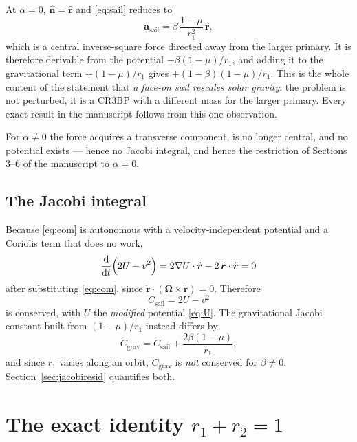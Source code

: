\documentclass[11pt,a4paper]{article}
\newcommand{\rhat}{\hat{\bm{r}}}
\newcommand{\nhat}{\hat{\bm{n}}}
\begin{document}
At $\alpha=0$, $\nhat=\rhat$ and \eqref{eq:sail} reduces to
\begin{equation}
  \bm{a}_{\mathrm{sail}} = \beta\,\frac{1-\mu}{r_1^2}\,\rhat ,
\end{equation}
which is a central inverse-square force directed away from the larger primary.
It is therefore derivable from the potential $-\beta(1-\mu)/r_1$, and adding it
to the gravitational term $+(1-\mu)/r_1$ gives $+(1-\beta)(1-\mu)/r_1$. This is
the whole content of the statement that \emph{a face-on sail rescales solar
gravity}: the problem is not perturbed, it is a CR3BP with a different mass for
the larger primary. Every exact result in the manuscript follows from this one
observation.

For $\alpha\neq0$ the force acquires a transverse component, is no longer
central, and no potential exists --- hence no Jacobi integral, and hence the
restriction of Sections 3--6 of the manuscript to $\alpha=0$.

\subsection{The Jacobi integral}

Because \eqref{eq:eom} is autonomous with a velocity-independent potential and a
Coriolis term that does no work,
\begin{equation}
  \frac{\mathrm{d}}{\mathrm{d}t}\Bigl(2U-v^2\Bigr)
  = 2\nabla U\cdot\dot{\bm r} - 2\,\dot{\bm r}\cdot\ddot{\bm r} = 0
\end{equation}
after substituting \eqref{eq:eom}, since
$\dot{\bm r}\cdot(\bm\Omega\times\dot{\bm r})=0$. Therefore
\begin{equation}
  C_{\mathrm{sail}} = 2U - v^2
  \label{eq:jacobi}
\end{equation}
is conserved, with $U$ the \emph{modified} potential \eqref{eq:U}. The
gravitational Jacobi constant built from $(1-\mu)/r_1$ instead differs by
\begin{equation}
  C_{\mathrm{grav}} = C_{\mathrm{sail}} + \frac{2\beta(1-\mu)}{r_1},
  \label{eq:cgrav}
\end{equation}
and since $r_1$ varies along an orbit, $C_{\mathrm{grav}}$ is \emph{not}
conserved for $\beta\neq0$. Section~\ref{sec:jacobiresid} quantifies both.

\section{The exact identity \texorpdfstring{$r_1+r_2=1$}{r1+r2=1}}\label{sec:unitsum}
\end{document}
